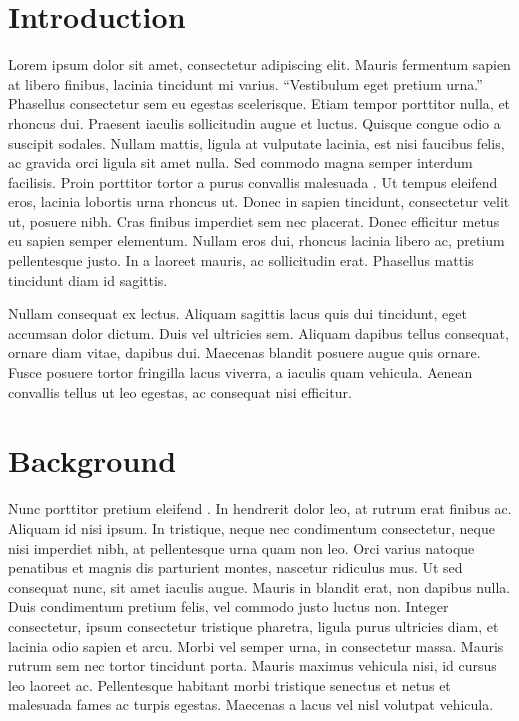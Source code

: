\documentclass[11pt]{article}           %
\begin{document}
\begin{multicols}{2}
	
\section{Introduction}

Lorem ipsum dolor sit amet, consectetur adipiscing elit. Mauris fermentum sapien at libero finibus, lacinia tincidunt mi varius. \enquote{Vestibulum eget pretium urna.} Phasellus consectetur sem eu egestas scelerisque. Etiam tempor porttitor nulla, et rhoncus dui. Praesent iaculis sollicitudin augue et luctus. Quisque congue odio a suscipit sodales. Nullam mattis, ligula at vulputate lacinia, est nisi faucibus felis, ac gravida orci ligula sit amet nulla. Sed commodo magna semper interdum facilisis. Proin porttitor tortor a purus convallis malesuada \citep{boeing_new_2017}. Ut tempus eleifend eros, lacinia lobortis urna rhoncus ut. Donec in sapien tincidunt, consectetur velit ut, posuere nibh. Cras finibus imperdiet sem nec placerat. Donec efficitur metus eu sapien semper elementum. Nullam eros dui, rhoncus lacinia libero ac, pretium pellentesque justo. In a laoreet mauris, ac sollicitudin erat. Phasellus mattis tincidunt diam id sagittis.

Nullam consequat ex lectus. Aliquam sagittis lacus quis dui tincidunt, eget accumsan dolor dictum. Duis vel ultricies sem. Aliquam dapibus tellus consequat, ornare diam vitae, dapibus dui. Maecenas blandit posuere augue quis ornare. Fusce posuere tortor fringilla lacus viverra, a iaculis quam vehicula. Aenean convallis tellus ut leo egestas, ac consequat nisi efficitur.

\section{Background}

Nunc porttitor pretium eleifend \citep{boarnet_travel_2001}. In hendrerit dolor leo, at rutrum erat finibus ac. Aliquam id nisi ipsum. In tristique, neque nec condimentum consectetur, neque nisi imperdiet nibh, at pellentesque urna quam non leo. Orci varius natoque penatibus et magnis dis parturient montes, nascetur ridiculus mus. Ut sed consequat nunc, sit amet iaculis augue. Mauris in blandit erat, non dapibus nulla. Duis condimentum pretium felis, vel commodo justo luctus non. Integer consectetur, ipsum consectetur tristique pharetra, ligula purus ultricies diam, et lacinia odio sapien et arcu. Morbi vel semper urna, in consectetur massa. Mauris rutrum sem nec tortor tincidunt porta. Mauris maximus vehicula nisi, id cursus leo laoreet ac. Pellentesque habitant morbi tristique senectus et netus et malesuada fames ac turpis egestas. Maecenas a lacus vel nisl volutpat vehicula.


\end{multicols}
\end{document}
